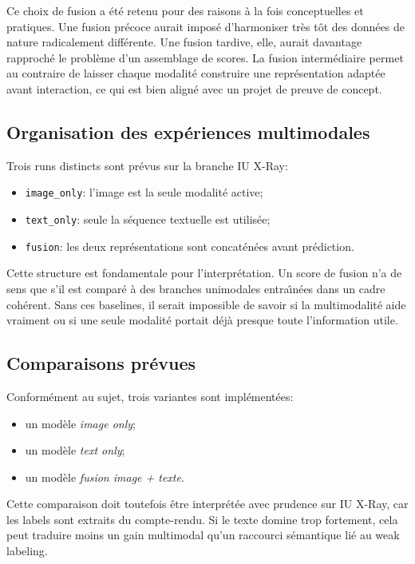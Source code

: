 \documentclass[11pt,a4paper]{article}
\begin{document}
Ce choix de fusion a \'et\'e retenu pour des raisons \`a la fois conceptuelles et pratiques. Une fusion pr\'ecoce aurait impos\'e d'harmoniser tr\`es t\^ot des donn\'ees de nature radicalement diff\'erente. Une fusion tardive, elle, aurait davantage rapproch\'e le probl\`eme d'un assemblage de scores. La fusion interm\'ediaire permet au contraire de laisser chaque modalit\'e construire une repr\'esentation adapt\'ee avant interaction, ce qui est bien align\'e avec un projet de preuve de concept.

\subsection{Organisation des exp\'eriences multimodales}
Trois runs distincts sont pr\'evus sur la branche IU X-Ray:
\begin{itemize}
    \item \texttt{image\_only}: l'image est la seule modalit\'e active;
    \item \texttt{text\_only}: seule la s\'equence textuelle est utilis\'ee;
    \item \texttt{fusion}: les deux repr\'esentations sont concat\'en\'ees avant pr\'ediction.
\end{itemize}

Cette structure est fondamentale pour l'interpr\'etation. Un score de fusion n'a de sens que s'il est compar\'e \`a des branches unimodales entra\^\i n\'ees dans un cadre coh\'erent. Sans ces baselines, il serait impossible de savoir si la multimodalit\'e aide vraiment ou si une seule modalit\'e portait d\'ej\`a presque toute l'information utile.

\subsection{Comparaisons pr\'evues}
Conform\'ement au sujet, trois variantes sont impl\'ement\'ees:
\begin{itemize}
    \item un mod\`ele \emph{image only};
    \item un mod\`ele \emph{text only};
    \item un mod\`ele \emph{fusion image + texte}.
\end{itemize}

Cette comparaison doit toutefois \^etre interpr\'et\'ee avec prudence sur IU X-Ray, car les labels sont extraits du compte-rendu. Si le texte domine trop fortement, cela peut traduire moins un gain multimodal qu'un raccourci s\'emantique li\'e au weak labeling.
\end{document}

